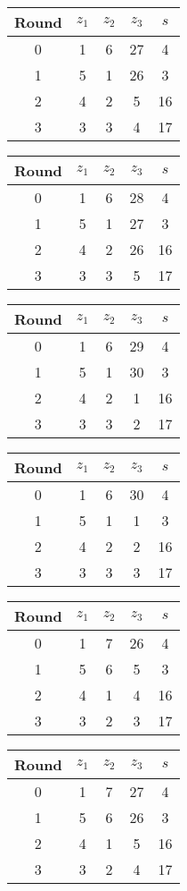 \begin{multicols}{2}
\begin{tabular}{c | c | c | c | c }
Round & $z_1$ & $z_2$ & $z_3$ & $s$ \\
\hline
0 & 1 & 6 & 27 & 4 \\
1 & 5 & 1 & 26 & 3 \\
2 & 4 & 2 & 5 & 16 \\
3 & 3 & 3 & 4 & 17
\end{tabular}


\begin{tabular}{c | c | c | c | c }
Round & $z_1$ & $z_2$ & $z_3$ & $s$ \\
\hline
0 & 1 & 6 & 28 & 4 \\
1 & 5 & 1 & 27 & 3 \\
2 & 4 & 2 & 26 & 16 \\
3 & 3 & 3 & 5 & 17
\end{tabular}


\begin{tabular}{c | c | c | c | c }
Round & $z_1$ & $z_2$ & $z_3$ & $s$ \\
\hline
0 & 1 & 6 & 29 & 4 \\
1 & 5 & 1 & 30 & 3 \\
2 & 4 & 2 & 1 & 16 \\
3 & 3 & 3 & 2 & 17
\end{tabular}


\begin{tabular}{c | c | c | c | c }
Round & $z_1$ & $z_2$ & $z_3$ & $s$ \\
\hline
0 & 1 & 6 & 30 & 4 \\
1 & 5 & 1 & 1 & 3 \\
2 & 4 & 2 & 2 & 16 \\
3 & 3 & 3 & 3 & 17
\end{tabular}


\begin{tabular}{c | c | c | c | c }
Round & $z_1$ & $z_2$ & $z_3$ & $s$ \\
\hline
0 & 1 & 7 & 26 & 4 \\
1 & 5 & 6 & 5 & 3 \\
2 & 4 & 1 & 4 & 16 \\
3 & 3 & 2 & 3 & 17
\end{tabular}


\begin{tabular}{c | c | c | c | c }
Round & $z_1$ & $z_2$ & $z_3$ & $s$ \\
\hline
0 & 1 & 7 & 27 & 4 \\
1 & 5 & 6 & 26 & 3 \\
2 & 4 & 1 & 5 & 16 \\
3 & 3 & 2 & 4 & 17
\end{tabular}



\end{multicols}
